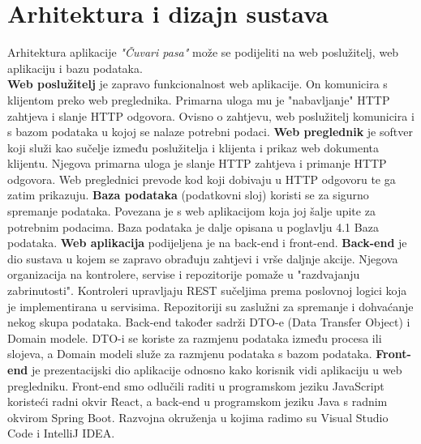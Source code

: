 \chapter{Arhitektura i dizajn sustava}
		
		Arhitektura aplikacije \textit{"Čuvari pasa"} može se podijeliti na web poslužitelj, web aplikaciju i bazu podataka.
		\\
		\newline
		\textbf{Web poslužitelj} je zapravo funkcionalnost web aplikacije. On komunicira s klijentom preko web preglednika. Primarna uloga mu je "nabavljanje" HTTP zahtjeva i slanje HTTP odgovora. Ovisno o zahtjevu, web poslužitelj komunicira i s bazom podataka u kojoj se nalaze potrebni podaci. 
		\newline
		\textbf{Web preglednik} je softver koji služi kao sučelje između poslužitelja i klijenta i prikaz web dokumenta klijentu. Njegova primarna uloga je slanje HTTP zahtjeva i primanje HTTP odgovora. Web preglednici prevode kod koji dobivaju u HTTP odgovoru te ga zatim prikazuju.
		\newline
		\textbf{Baza podataka} (podatkovni sloj) koristi se za sigurno spremanje podataka. Povezana je s web aplikacijom koja joj šalje upite za potrebnim podacima. Baza podataka je dalje opisana u poglavlju 4.1 Baza podataka.
		\newline
		\textbf{Web aplikacija} podijeljena je na back-end i front-end. 
		\newline
		\textbf{Back-end} je dio sustava u kojem se zapravo obrađuju zahtjevi i vrše daljnje akcije. Njegova organizacija na kontrolere, servise i repozitorije pomaže u "razdvajanju zabrinutosti".
		Kontroleri upravljaju REST sučeljima prema poslovnoj logici koja je implementirana u servisima. Repozitoriji su zaslužni za spremanje i dohvaćanje nekog skupa podataka.
		Back-end također sadrži DTO-e (Data Transfer Object) i Domain modele. DTO-i se koriste za razmjenu podataka između procesa ili slojeva, a Domain modeli služe za razmjenu podataka s bazom podataka.
		\newline
		\textbf{Front-end} je prezentacijski dio aplikacije odnosno kako korisnik vidi aplikaciju u web pregledniku.
		\newline
		Front-end smo odlučili raditi u programskom jeziku JavaScript koristeći radni okvir React, a back-end u programskom jeziku Java s radnim okvirom Spring Boot. Razvojna okruženja u kojima radimo su Visual Studio Code i IntelliJ IDEA.
		

